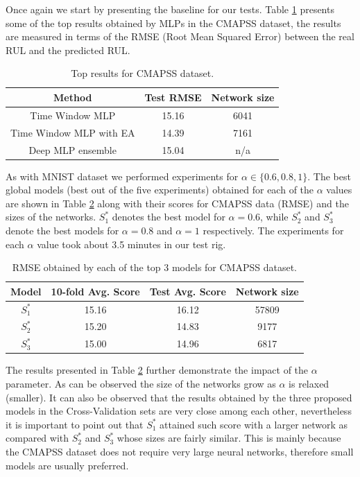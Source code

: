 \documentclass[journal]{IEEEtran}
\begin{document}
Once again we start by presenting the baseline for our tests. Table \ref{table:CMAPSS_results_top} presents some of the top results obtained by MLPs in the CMAPSS dataset, the results are measured in terms of the RMSE (Root Mean Squared Error) between the real RUL and the predicted RUL. 

\begin{table}[!htb]
\begin{center}
\begin{tabular}{| c | c | c |}
\hline
Method & Test RMSE & Network size \\
\hline
Time Window MLP \cite{Lim2016} & 15.16 & 6041\\
Time Window MLP with EA \cite{Laredo2018} & 14.39 & 7161\\
Deep MLP ensemble \cite{Zhang2016} & 15.04 &  n/a \\
\hline
\end{tabular}
\end{center}
\caption{Top results for CMAPSS dataset.}
\label{table:CMAPSS_results_top}
\end{table}

As with MNIST dataset we performed experiments for $\alpha \in \{0.6, 0.8, 1\}$. The best global models (best out of the five experiments) obtained for each of the $\alpha$ values are shown in Table \ref{table:avg_rmse_cmapss} along with their scores for CMAPSS data (RMSE) and the sizes of the networks. $S^*_1$ denotes the best model for $\alpha = 0.6$, while $S^*_2$ and $S^*_3$ denote the best models for $\alpha = 0.8$ and $\alpha = 1$ respectively. The experiments for each $\alpha$ value took about 3.5 minutes in our test rig.

\begin{table}[!htb]
\begin{center}
\begin{tabular}{| c | c | c | c |}
\hline
Model & 10-fold Avg. Score & Test Avg. Score & Network size\\
\hline
$S^*_1$ & 15.16 & 16.12 & 57809\\
$S^*_2$ & 15.20 & 14.83 & 9177\\
$S^*_3$ & 15.00 & 14.96 & 6817\\
\hline
\end{tabular}
\end{center}
\caption{RMSE obtained by each of the top 3 models for CMAPSS dataset.}
\label{table:avg_rmse_cmapss}
\end{table}

The results presented in Table \ref{table:avg_rmse_cmapss} further demonstrate the impact of the $\alpha$ parameter. As can be observed the size of the networks grow as $\alpha$ is relaxed (smaller). It can also be observed that the results obtained by the three proposed models in the Cross-Validation sets are very close among each other, nevertheless it is important to point out that $S^*_1$ attained such score with a larger network as compared with $S^*_2$ and $S^*_3$ whose sizes are fairly similar. This is mainly because the CMAPSS dataset does not require very large neural networks, therefore small models are usually preferred. 
\end{document}
